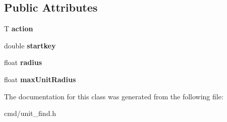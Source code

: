 \subsection*{Public Attributes}
\begin{DoxyCompactItemize}
\item 
T {\bfseries action}\hypertarget{classUnitWithinRangeLocator_a2e367b875750cc6ce44bc460998d2cec}{}\label{classUnitWithinRangeLocator_a2e367b875750cc6ce44bc460998d2cec}

\item 
double {\bfseries startkey}\hypertarget{classUnitWithinRangeLocator_a2694342c1dfa860aad0b903e3839376a}{}\label{classUnitWithinRangeLocator_a2694342c1dfa860aad0b903e3839376a}

\item 
float {\bfseries radius}\hypertarget{classUnitWithinRangeLocator_af159bba1bda0d9fb8dc2addd41b75be6}{}\label{classUnitWithinRangeLocator_af159bba1bda0d9fb8dc2addd41b75be6}

\item 
float {\bfseries max\+Unit\+Radius}\hypertarget{classUnitWithinRangeLocator_a8e9f096fff3333b6b6e1cb62268f136a}{}\label{classUnitWithinRangeLocator_a8e9f096fff3333b6b6e1cb62268f136a}

\end{DoxyCompactItemize}


The documentation for this class was generated from the following file\+:\begin{DoxyCompactItemize}
\item 
cmd/unit\+\_\+find.\+h\end{DoxyCompactItemize}
